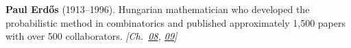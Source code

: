 \textbf{Paul Erdős} (1913–1996). Hungarian mathematician who developed the probabilistic method in combinatorics and published approximately 1,500 papers with over 500 collaborators. \emph{[Ch.~\hyperref[ch:boundedprimegaps]{08}, \hyperref[ch:arrowtheoremtopology]{09}]}

